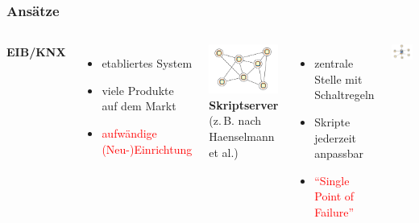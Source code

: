 \documentclass[t,compress,logoflat,faulogo]{beamer}
\newcommand{\customitemsep}{7pt}
\begin{document}
\begin{frame}
	\frametitle{Ansätze}
    \begin{columns}[c]
        \column[c]{10cm}
            \textbf{EIB/KNX}
            \begin{itemize} \setlength{\itemsep}{\customitemsep}
                \item etabliertes System
                \item viele Produkte auf dem Markt
                    \vspace*{0.5cm}
                \item \textcolor{red}{aufwändige (Neu-)Einrichtung}
            \end{itemize}
            \includegraphics[width=.9\linewidth]{img/decentralize-network.pdf}
            \pause
        \column{10cm}
            \textbf{Skriptserver} \\
            {\fontsize{15pt}{18pt} \selectfont (z.\,B. nach Haenselmann et al.)}
            \begin{itemize} \setlength{\itemsep}{\customitemsep}
                \item zentrale Stelle mit Schaltregeln
                \item Skripte jederzeit anpassbar
                    \vspace*{0.5cm}
                \item \textcolor{red}{\enquote{Single Point of Failure}}
            \end{itemize}
            \includegraphics[width=.9\linewidth]{img/centralize-network.pdf}
    \end{columns}
\end{frame}
\end{document}
